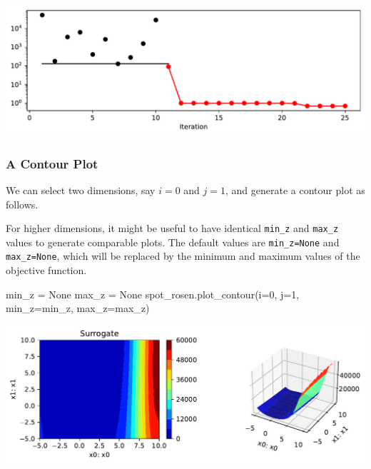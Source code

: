 \documentclass[
  letterpaper,
  DIV=11,
  numbers=noendperiod]{scrreprt}
\newenvironment{Shaded}{\begin{snugshade}}{\end{snugshade}}
\newcommand{\DecValTok}[1]{\textcolor[rgb]{0.68,0.00,0.00}{#1}}
\newcommand{\NormalTok}[1]{\textcolor[rgb]{0.00,0.23,0.31}{#1}}
\newcommand{\OperatorTok}[1]{\textcolor[rgb]{0.37,0.37,0.37}{#1}}
\newcommand{\VariableTok}[1]{\textcolor[rgb]{0.07,0.07,0.07}{#1}}
\begin{document}
\includegraphics{008_num_spot_multidim_files/figure-pdf/cell-16-output-1.pdf}

\subsubsection{A Contour Plot}\label{a-contour-plot-1}

We can select two dimensions, say \(i=0\) and \(j=1\), and generate a
contour plot as follows.

\begin{tcolorbox}[enhanced jigsaw, rightrule=.15mm, coltitle=black, title=\textcolor{quarto-callout-note-color}{\faInfo}\hspace{0.5em}{Note:}, opacitybacktitle=0.6, bottomrule=.15mm, opacityback=0, left=2mm, colback=white, leftrule=.75mm, colframe=quarto-callout-note-color-frame, colbacktitle=quarto-callout-note-color!10!white, toprule=.15mm, toptitle=1mm, bottomtitle=1mm, titlerule=0mm, breakable, arc=.35mm]

For higher dimensions, it might be useful to have identical
\texttt{min\_z} and \texttt{max\_z} values to generate comparable plots.
The default values are \texttt{min\_z=None} and \texttt{max\_z=None},
which will be replaced by the minimum and maximum values of the
objective function.

\end{tcolorbox}

\begin{Shaded}
\begin{Highlighting}[]
\NormalTok{min\_z }\OperatorTok{=} \VariableTok{None}
\NormalTok{max\_z }\OperatorTok{=} \VariableTok{None}
\NormalTok{spot\_rosen.plot\_contour(i}\OperatorTok{=}\DecValTok{0}\NormalTok{, j}\OperatorTok{=}\DecValTok{1}\NormalTok{, min\_z}\OperatorTok{=}\NormalTok{min\_z, max\_z}\OperatorTok{=}\NormalTok{max\_z)}
\end{Highlighting}
\end{Shaded}

\includegraphics{008_num_spot_multidim_files/figure-pdf/cell-17-output-1.pdf}
\end{document}
